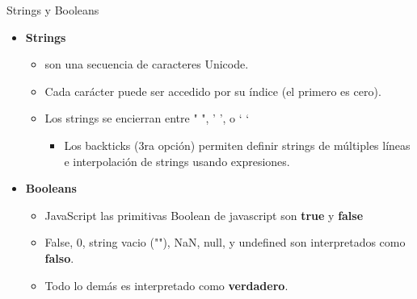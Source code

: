 \documentclass[aspectratio=43,10pt,t]{beamer}
\begin{document}
\begin{frame}{Strings y Booleans}\relax
\begingroup
{}
\begin{itemize}
  \item {\fontsize{12.2}{16.6}\selectfont \textbf{Strings}\par}
  \begin{itemize}
    \item son una secuencia de caracteres Unicode.
    \item Cada carácter puede ser accedido por su índice (el primero es cero).
    \item Los strings se encierran entre " ", ' ', o ` `
    \begin{itemize}
      \item Los backticks (3ra opción) permiten definir strings de múltiples líneas e interpolación de strings usando expresiones.
    \end{itemize}
  \end{itemize}
\end{itemize}
{\fontsize{10.2}{13.8}\selectfont\mbox{}\par}
\begin{itemize}
  \item {\fontsize{13.2}{18.0}\selectfont \textbf{Booleans}\par}
  \begin{itemize}
    \item JavaScript las primitivas Boolean de javascript son \textbf{true} y \textbf{false}
    \item False, 0, string vacio (""), NaN, null, y undefined son interpretados como \textbf{falso}.
    \item Todo lo demás es interpretado como \textbf{verdadero}.
  \end{itemize}
\end{itemize}
\endgroup
{}
\end{frame}
\end{document}
